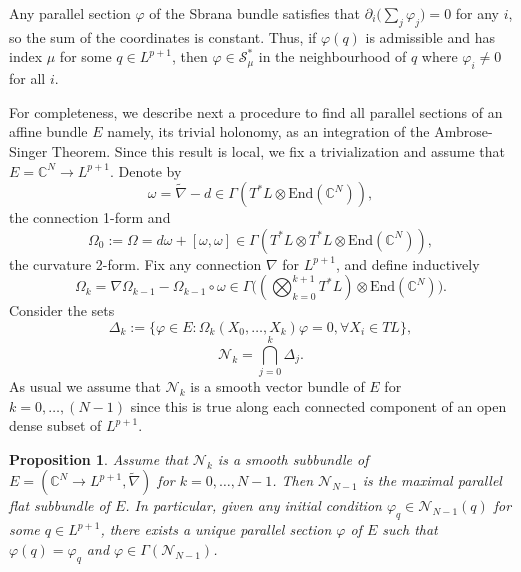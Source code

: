 \documentclass{article}
\newtheorem{prop}[thm]{Proposition}
\theoremstyle{remark}
\begin{document}
Any parallel section $\varphi$ of the Sbrana bundle satisfies that $\partial_i\big(\sum_j\varphi_j\big)=0$ for any $i$, so the sum of the coordinates is constant. Thus, if $\varphi(q)$ is admissible and has index $\mu$ for some $q\in L^{p+1}$, then $\varphi\in\mathcal{S}_\mu^{*}$ in the neighbourhood of $q$ where $\varphi_i\neq 0$ for all $i$.


For completeness, we describe next a procedure to find all parallel sections of an affine bundle $E$ namely, its trivial holonomy, as an integration of the Ambrose-Singer Theorem.
Since this result is local, we fix a trivialization and assume that $E=\mathbb{C}^{N}\rightarrow L^{p+1}$.
Denote by
\begin{equation*}
    \omega=\tilde{\nabla}-d \in\Gamma(T^{*}L\otimes \text{End}(\mathbb{C}^N)),
\end{equation*}
the connection 1-form and
\begin{equation*}
    \Omega_0:=\Omega=d\omega+[\omega,\omega]\in\Gamma(T^{*}L\otimes T^{*}L\otimes\text{End}(\mathbb{C}^N)),
\end{equation*}
the curvature 2-form. Fix any connection $\nabla$ for $L^{p+1}$, and define inductively
\begin{equation*}
    \Omega_k=\nabla\Omega_{k-1}-\Omega_{k-1}\circ\omega\in\Gamma\Big((\bigotimes_{k=0}^{k+1}T^{*}L)\otimes\text{End}(\mathbb{C}^N)\Big).
\end{equation*} 
Consider the sets
\begin{equation*}
    \Delta_{k}:=\{\varphi\in E:\Omega_k(X_0,\ldots,X_k)\varphi=0,\forall X_i\in TL\},
\end{equation*}
\begin{equation*}
    \mathcal{N}_k=\bigcap_{j=0}^k\Delta_{j}.
\end{equation*}
As usual we assume that $\mathcal{N}_k$ is a smooth vector bundle of $E$ for $k=0,\ldots,(N-1)$ since this is true along each connected component of an open dense subset of $L^{p+1}$.
\begin{prop}
    Assume that $\mathcal{N}_k$ is a smooth subbundle of $E=(\mathbb{C}^N\rightarrow L^{p+1},\tilde{\nabla})$ for $k=0,\ldots,N-1$. Then $\mathcal{N}_{N-1}$ is the maximal parallel flat subbundle of $E$. In particular, given any initial condition $\varphi_q\in \mathcal{N}_{N-1}(q)$ for some $q\in L^{p+1}$, there exists a unique parallel section $\varphi$ of $E$ such that $\varphi(q)=\varphi_q$ and $\varphi\in\Gamma(\mathcal{N}_{N-1})$. 
\end{prop}
\end{document}
